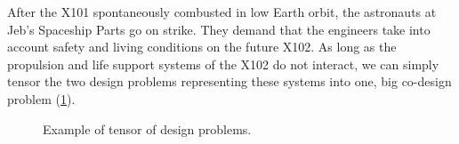 \begin{example}
    After the X101 spontaneously combusted in low Earth orbit, the astronauts at Jeb's Spaceship Parts go on strike.
    They demand that the engineers take into account safety and living conditions on the future X102.
    As long as the propulsion and life support systems of the X102 do not interact, we can simply tensor the two design problems representing these systems into one, big co-design problem (\cref{fig:examplemonoidal}).
    \begin{figure}[h!]
        \centering
        \caption{Example of tensor of design problems. }
        \label{fig:examplemonoidal}
    \end{figure}
\end{example}
